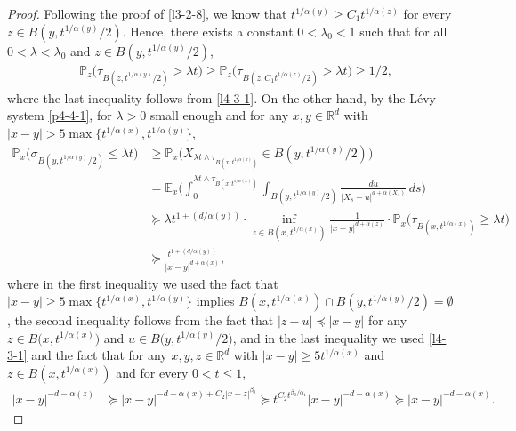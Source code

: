 \documentclass[a4paper,11pt]{amsart}
\renewcommand{\le}{\leqslant}
\renewcommand{\ge}{\geqslant}
\newcommand{\R}{\mathds R}
\newcommand{\B}{\beta}
\newcommand{\Pp}{\mathds P}
\newcommand{\Ee}{\mathds E}
\newcommand{\p}{\preceq}
\newcommand{\q}{\succeq}
\newcommand{\A}{\alpha}
\theoremstyle{definition}
\begin{document}
\begin{proof}
Following the proof of \eqref{l3-2-8}, we know that
$t^{{1}/{\A(y)}}\ge C_1 t^{{1}/{\A(z)}}$ for every $z \in B(y,t^{{1}/{\A(y)}}/2)$.
Hence, there exists a constant $0<\lambda_0<1$ such that for all $0<\lambda<\lambda_0$
and $z \in B(y,t^{{1}/{\A(y)}}/2)$,
\begin{equation}\label{t4-4-3}
\begin{split}
&\Pp_z\big(\tau_{B(z,t^{{1}/{\A(y)}}/2)}>\lambda t\big)
\ge \Pp_z\big(\tau_{B(z,{C_1t^{{1}/{\A(z)}}}/{2})}>\lambda t\big)\ge {1}/{2},
\end{split}
\end{equation}
where the last inequality  follows from \eqref{l4-3-1}.
On the other hand, by the L\'evy system \eqref{p4-4-1}, for $\lambda>0$ small enough and for any $x,y\in \R^d$ with $
|x-y|>5\max\{t^{{1}/{\A(x)}},t^{{1}/{\A(y)}}\}$,
\begin{equation}\label{t4-4-4}
\begin{split}
 \Pp_x\big(\sigma_{B(y,t^{{1}/{\A(y)}}/2)}\le \lambda t\big)
&\ge \Pp_x\big(X_{\lambda t \wedge \tau_{B(x,t^{{1}/{\A(x)}})}}\in B(y,t^{{1}/{\A(y)}}/2)\big)\\
&=\Ee_x\bigg(\int_0^{\lambda t \wedge \tau_{B(x,t^{{1}/{\A(x)}})}}
\int_{B(y,t^{{1}/{\A(y)}}/2)}\frac{du}{|X_s-u|^{d+\A(X_s)}}\,ds\bigg)\\
&\q \lambda t^{1+({d}/{\A(y)})}\cdot \inf_{z \in B(x,t^{{1}/{\A(x)}})}\frac{1}{|x-y|^{d+\A(z)}}
\cdot \Pp_x\big(\tau_{B(x,t^{{1}/{\A(x)}})}\ge \lambda t\big)\\
&\q \frac{t^{1+({d}/{\A(y)})}}{|x-y|^{d+\A(x)}},
\end{split}
\end{equation}
where in the first inequality we used the fact that
$|x-y|\ge 5\max\{t^{{1}/{\A(x)}},t^{{1}/{\A(y)}}\}$ implies $B(x,t^{{1}/{\A(x)}})\cap
B(y,t^{{1}/{\A(y)}}/2)=\emptyset$, the second inequality follows from the fact that
$|z-u|\p |x-y|$ for any $z \in B\big(x,t^{{1}/{\A(x)}}\big)$
and $u \in B\big(y,t^{{1}/{\A(y)}}/2\big)$, and in the last inequality we used
\eqref{l4-3-1} and the fact that for any $x,y,z\in \R^d$ with $|x-y|\ge 5t^{{1}/{\A(x)}}$ and $z \in
B(x,t^{{1}/{\A(x)}})$ and for every $0<t\le 1$,
\begin{align*}
|x-y|^{-d-\A(z)}&\q |x-y|^{-d-\A(x)+C_2|x-z|^{\B_0}}\q t^{C_2t^{{\B_0}/{\A_1}}}|x-y|^{-d-\A(x)}\q |x-y|^{-d-\A(x)}.
\end{align*}


\end{proof}
\end{document}
